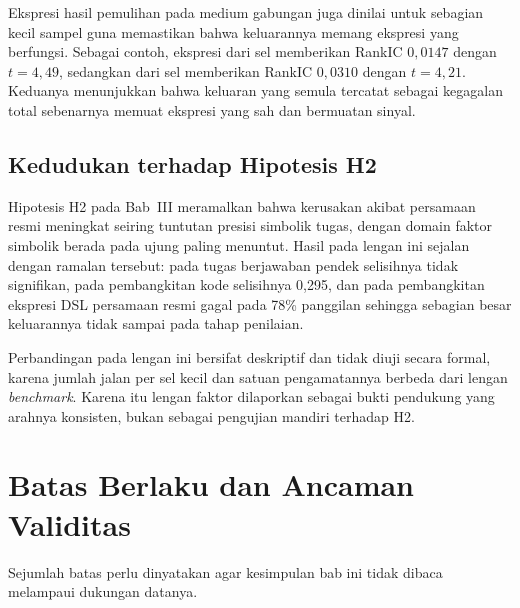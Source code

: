 Ekspresi hasil pemulihan pada medium gabungan juga dinilai untuk sebagian kecil
sampel guna memastikan bahwa keluarannya memang ekspresi yang berfungsi.
Sebagai contoh, ekspresi 
dari sel  memberikan RankIC $0{,}0147$ dengan $t = 4{,}49$, sedangkan
 dari sel 
memberikan RankIC $0{,}0310$ dengan $t = 4{,}21$. Keduanya menunjukkan bahwa
keluaran yang semula tercatat sebagai kegagalan total sebenarnya memuat
ekspresi yang sah dan bermuatan sinyal.

\subsection{Kedudukan terhadap Hipotesis H2}

Hipotesis H2 pada Bab~III meramalkan bahwa kerusakan akibat persamaan resmi
meningkat seiring tuntutan presisi simbolik tugas, dengan domain faktor
simbolik berada pada ujung paling menuntut. Hasil pada lengan ini sejalan
dengan ramalan tersebut: pada tugas berjawaban pendek selisihnya tidak
signifikan, pada pembangkitan kode selisihnya 0,295, dan pada pembangkitan
ekspresi DSL persamaan resmi gagal pada 78\% panggilan sehingga sebagian besar
keluarannya tidak sampai pada tahap penilaian.

Perbandingan pada lengan ini bersifat deskriptif dan tidak diuji secara formal,
karena jumlah jalan per sel kecil dan satuan pengamatannya berbeda dari lengan
\textit{benchmark}. Karena itu lengan faktor dilaporkan sebagai bukti
pendukung yang arahnya konsisten, bukan sebagai pengujian mandiri terhadap H2.

\section{Batas Berlaku dan Ancaman Validitas}
\label{sec:batas}

Sejumlah batas perlu dinyatakan agar kesimpulan bab ini tidak dibaca melampaui
dukungan datanya.

